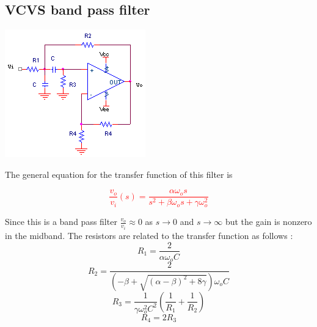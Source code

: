 \subsection{VCVS band pass filter}
\begin{center}
	\includegraphics{schematics/vcvs_bandpass.PNG}
\end{center}
The general equation for the transfer function of this filter is

\textcolor{red}{
\begin{equation}
\frac{v_{o}}{v_{i}}(s) = \frac{\alpha \omega_{o}s}{s^{2}+\beta \omega_{o}s + \gamma \omega_{o}^{2}}
\label{eq:vcvs_bandpass}
\end{equation}
}

Since this is a band pass filter $\frac{v_{o}}{v_{i}} \approx 0$ as $s \rightarrow 0$ and $s \rightarrow \infty$ but the gain is nonzero in the midband. The resistors are related to the transfer function as follows \autocite[138-139]{op-amp-circuits-johnson}:
\begin{equation}
R_1 = \frac{2}{\alpha \omega_{o}C}
\end{equation}
\begin{equation}
R_2 = \frac{2}{(-\beta+\sqrt{(\alpha - \beta)^2 + 8\gamma})\omega_{o}C}
\end{equation}
\begin{equation}
R_3 = \frac{1}{\gamma \omega_{o}^2 C^2}\left(\frac{1}{R_1} + \frac{1}{R_2}\right)
\end{equation}
\begin{equation}
R_4 = 2R_3
\end{equation}

